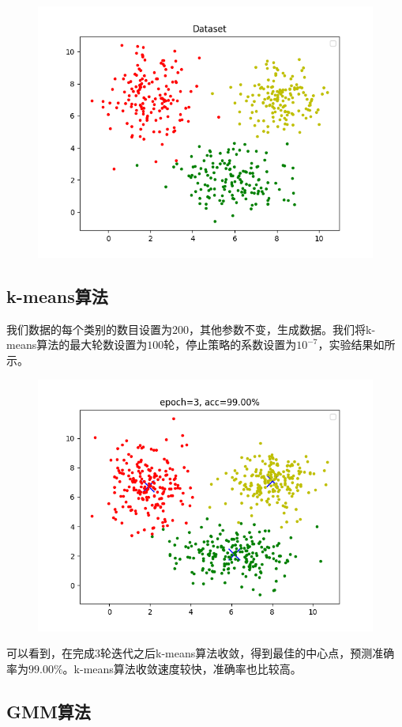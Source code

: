 \documentclass[lang=cn,11pt,a4paper,cite=authoryear]{elegantpaper}
\begin{document}
\begin{figure}[H]
	\centering
	\includegraphics[width=0.7\linewidth]{images/ml_lab3_1.png}
	\caption{}
	\label{fig:mllab31}
\end{figure}


\subsection{k-means算法}

我们数据的每个类别的数目设置为$200$，其他参数不变，生成数据。我们将k-means算法的最大轮数设置为$100$轮，停止策略的系数设置为$10^{-7}$，实验结果如所示。

\begin{figure}[h]
	\centering
	\includegraphics[width=0.7\linewidth]{images/ml_lab3_2.png}
	\caption{}
	\label{fig:mllab32}
\end{figure}

可以看到，在完成$3$轮迭代之后k-means算法收敛，得到最佳的中心点，预测准确率为$99.00\%$。k-means算法收敛速度较快，准确率也比较高。


\subsection{GMM算法}
\end{document}
